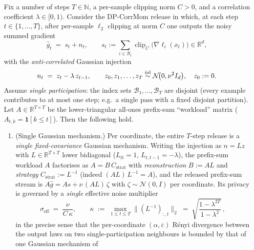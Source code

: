 \begin{theorem}
\label{thm:corrmom-privacy}
Fix a number of steps $T\in\mathbb{N}$, a per-sample clipping norm $C>0$, and a correlation
coefficient $\lambda\in[0,1)$. Consider the DP-CorrMom release in which, at each step
$t\in\{1,\dots,T\}$, after per-sample $\ell_2$ clipping at norm $C$ one outputs the noisy
summed gradient
\begin{equation}
\hat g_t \;=\; s_t + n_t,\qquad
s_t := \sum_{i\in\mathcal B_t}\operatorname{clip}_C\!\big(\nabla\ell_i(x_t)\big)\in\mathbb R^{d},
\label{eq:release}
\end{equation}
with the \emph{anti-correlated} Gaussian injection
\begin{equation}
n_t \;=\; z_t-\lambda\,z_{t-1},\qquad
z_0,z_1,\dots,z_T \stackrel{\textnormal{iid}}{\sim}\mathcal N\!\big(0,\nu^2 I_d\big),\quad z_0:=0 .
\label{eq:inject}
\end{equation}
Assume \emph{single participation}: the index sets $\mathcal B_1,\dots,\mathcal B_T$ are disjoint
(every example contributes to at most one step; e.g.\ a single pass with a fixed disjoint partition).
Let $A\in\mathbb R^{T\times T}$ be the lower-triangular all-ones prefix-sum ``workload'' matrix
($A_{t,k}=\mathbf 1[k\le t]$). Then the following hold.
\begin{enumerate}[label=\textnormal{(\roman*)}]
\item \textnormal{(Single Gaussian mechanism.)} Per coordinate, the entire $T$-step release is a
\emph{single fixed-covariance} Gaussian mechanism. Writing the injection as $n=Lz$ with
$L\in\mathbb R^{T\times T}$ lower bidiagonal ($L_{tt}=1$, $L_{t,t-1}=-\lambda$), the prefix-sum
workload $A$ factorises as $A=B\,C_{\mathrm{strat}}$ with \emph{reconstruction} $B:=AL$ and
\emph{strategy} $C_{\mathrm{strat}}:=L^{-1}$ (indeed $(AL)\,L^{-1}=A$), and the released prefix-sum
stream is $A\hat g=As+\nu\,(AL)\,\zeta$ with $\zeta\sim\mathcal N(0,I)$ per coordinate.
Its privacy is governed by a \emph{single} effective noise multiplier
\begin{equation}
\sigma_{\mathrm{eff}}\;=\;\frac{\nu}{C\,\kappa},\qquad
\kappa\;:=\;\max_{1\le t\le T}\big\|(L^{-1})_{:,t}\big\|_2
\;=\;\sqrt{\frac{1-\lambda^{2T}}{1-\lambda^{2}}}\,,
\label{eq:kappa}
\end{equation}
in the precise sense that the per-coordinate $(\alpha,\varepsilon)$ R\'enyi divergence between the
output laws on two single-participation neighbours is bounded by that of one Gaussian mechanism of

\end{enumerate}
\end{theorem}
